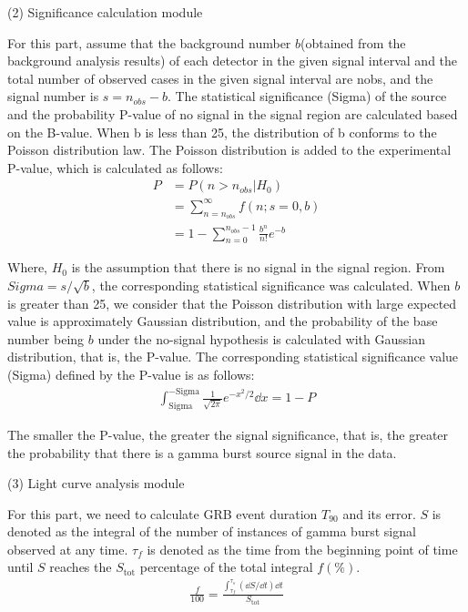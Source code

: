 \documentclass[prd,10pt]{revtex4-2}
\begin{document}
(2) Significance calculation module

For this part, assume that the background number $b$(obtained from the background analysis results) of each detector in the given signal interval and the total number of observed cases in the given signal interval are nobs, and the signal number is $s=n_{obs}-b$. The statistical significance (Sigma) of the source and the probability P-value of no signal in the signal region are calculated based on the B-value. When b is less than 25, the distribution of b conforms to the Poisson distribution law. The Poisson distribution is added to the experimental P-value, which is calculated as follows:
\begin{align}
    P&=P(n>n_{obs}|H_{0})\\
    &=\sum_{n=n_{obs}}^{\infty}f(n;s=0,b)\\
    &=1-\sum_{n=0}^{n_{obs}-1}\frac{b^{n}}{n!}e^{-b}
\end{align}

Where, $H_{0}$ is the assumption that there is no signal in the signal region. From $Sigma=s/\sqrt{b}$, the corresponding statistical significance was calculated. When $b$ is greater than 25, we consider that the Poisson distribution with large expected value is approximately Gaussian distribution, and the probability of the base number being $b$ under the no-signal hypothesis is calculated with Gaussian distribution, that is, the P-value. The corresponding statistical significance value (Sigma) defined by the P-value is as follows:
\begin{align}
    \int_{\text{Sigma}}^{-\text{Sigma}}\frac{1}{\sqrt{2\pi}}e^{-x^{2}/2}\dd{x}=1-P
\end{align}

The smaller the P-value, the greater the signal significance, that is, the greater the probability that there is a gamma burst source signal in the data.

(3) Light curve analysis module

For this part, we need to calculate GRB event duration $T_{90}$ and its error. $S$ is denoted as the integral of the number of instances of gamma burst signal observed at any time. $\tau_{f}$ is denoted as the time from the beginning point of time until $S$ reaches the $S_{\text{tot}}$ percentage of the total integral $f(\%)$.
\begin{align}
    \frac{f}{100}=\frac{\int_{\tau_{f}}^{\tau_{s}}(\dd{S}/\dd{t})\dd{t}}{S_{\text{tot}}}
\end{align}
\end{document}
